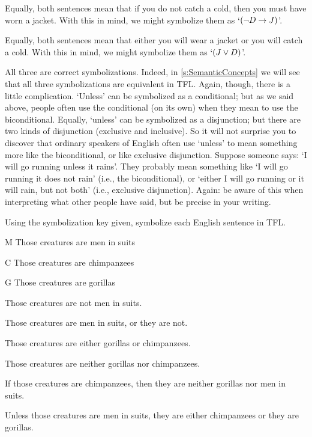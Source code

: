 Equally, both sentences mean that if you do not catch a cold, then you must have worn a jacket. With this in mind, we might symbolize them as `$(\neg D \rightarrow J)$'.

Equally, both sentences mean that either you will wear a jacket or you will catch a cold. With this in mind, we might symbolize them as `$(J \vee D)$'.

All three are correct symbolizations. Indeed, in \cref{s:SemanticConcepts} we will see that all three symbolizations are equivalent in TFL.
Again, though, there is a little complication. `Unless' can be symbolized as a conditional; but as we said above, people often use the conditional (on its own) when they mean to use the biconditional. Equally, `unless' can be symbolized as a disjunction; but there are two kinds of disjunction (exclusive and inclusive). So it will not surprise you to discover that ordinary speakers of English often use `unless' to mean something more like the biconditional, or like exclusive disjunction. Suppose someone says: `I will go running unless it rains'. They probably mean something like `I will go running \ifeff{} it does not rain' (i.e., the biconditional), or  `either I will go running or it will rain, but not both' (i.e., exclusive disjunction). Again: be aware of this when interpreting what other people have said, but be precise in your writing.

\practiceproblems
\solutions
\problempart Using the symbolization key given, symbolize each English sentence in TFL.\label{pr.monkeysuits}
	\begin{ekey}
		\item[M] Those creatures are men in suits
		\item[C] Those creatures are chimpanzees
		\item[G] Those creatures are gorillas
	\end{ekey}
\begin{compactlist}
\item Those creatures are not men in suits.
\item Those creatures are men in suits, or they are not.
\item Those creatures are either gorillas or chimpanzees.
\item Those creatures are neither gorillas nor chimpanzees.
\item If those creatures are chimpanzees, then they are neither gorillas nor men in suits.
\item Unless those creatures are men in suits, they are either chimpanzees or they are gorillas.
\end{compactlist}

